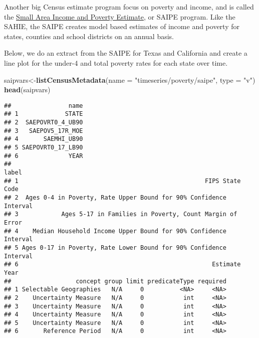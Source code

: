 \documentclass[]{article}
\newenvironment{Shaded}{\begin{snugshade}}{\end{snugshade}}
\newcommand{\KeywordTok}[1]{\textcolor[rgb]{0.13,0.29,0.53}{\textbf{#1}}}
\newcommand{\DataTypeTok}[1]{\textcolor[rgb]{0.13,0.29,0.53}{#1}}
\newcommand{\StringTok}[1]{\textcolor[rgb]{0.31,0.60,0.02}{#1}}
\newcommand{\NormalTok}[1]{#1}
\begin{document}
\newpage

Another big Census estimate program focus on poverty and income, and is
called the
\href{https://www.census.gov/programs-surveys/saipe.html}{Small Area
Income and Poverty Estimate}, or SAIPE program. Like the SAHIE, the
SAIPE creates model based estimates of income and poverty for states,
counties and school districts on an annual basis.

Below, we do an extract from the SAIPE for Texas and California and
create a line plot for the under-4 and total poverty rates for each
state over time.

\begin{Shaded}
\begin{Highlighting}[]
\NormalTok{saipvars<-}\KeywordTok{listCensusMetadata}\NormalTok{(}\DataTypeTok{name =} \StringTok{"timeseries/poverty/saipe"}\NormalTok{, }\DataTypeTok{type =} \StringTok{"v"}\NormalTok{)}
\KeywordTok{head}\NormalTok{(saipvars)}
\end{Highlighting}
\end{Shaded}

\begin{verbatim}
##                name
## 1             STATE
## 2  SAEPOVRT0_4_UB90
## 3   SAEPOV5_17R_MOE
## 4       SAEMHI_UB90
## 5 SAEPOVRT0_17_LB90
## 6              YEAR
##                                                                label
## 1                                                    FIPS State Code
## 2  Ages 0-4 in Poverty, Rate Upper Bound for 90% Confidence Interval
## 3            Ages 5-17 in Families in Poverty, Count Margin of Error
## 4    Median Household Income Upper Bound for 90% Confidence Interval
## 5 Ages 0-17 in Poverty, Rate Lower Bound for 90% Confidence Interval
## 6                                                      Estimate Year
##                  concept group limit predicateType required
## 1 Selectable Geographies   N/A     0          <NA>     <NA>
## 2    Uncertainty Measure   N/A     0           int     <NA>
## 3    Uncertainty Measure   N/A     0           int     <NA>
## 4    Uncertainty Measure   N/A     0           int     <NA>
## 5    Uncertainty Measure   N/A     0           int     <NA>
## 6       Reference Period   N/A     0           int     <NA>
\end{verbatim}
\end{document}
